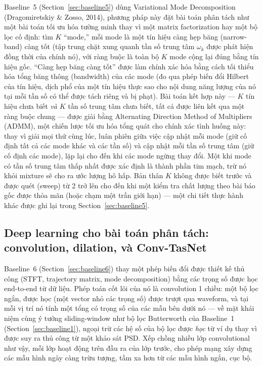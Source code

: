 \documentclass[11pt]{article}
\begin{document}
Baseline~5 (Section~\ref{sec:baseline5}) dùng Variational Mode
Decomposition (Dragomiretskiy \& Zosso, 2014), phương pháp này đặt bài
toán phân tách như một bài toán tối ưu hóa tường minh thay vì một matrix
factorization hay một bộ lọc cố định: tìm $K$ ``mode,'' mỗi mode là một
tín hiệu càng hẹp băng (narrow-band) càng tốt (tập trung chặt xung quanh
tần số trung tâm $\omega_k$ được phát hiện đồng thời của chính nó), với
ràng buộc là toàn bộ $K$ mode cộng lại đúng bằng tín hiệu gốc. ``Càng hẹp
băng càng tốt'' được làm chính xác hóa bằng cách tối thiểu hóa tổng băng
thông (bandwidth) của các mode (đo qua phép biến đổi Hilbert của tín
hiệu, dịch phổ của một tín hiệu thực sao cho nội dung năng lượng của nó
tại mỗi tần số có thể được tách riêng và bị phạt). Bài toán kết hợp này
--- $K$ tín hiệu chưa biết \emph{và} $K$ tần số trung tâm chưa biết, tất
cả được liên kết qua một ràng buộc chung --- được giải bằng Alternating
Direction Method of Multipliers (ADMM), một chiến lược tối ưu hóa tổng
quát cho chính xác tình huống này: thay vì giải mọi thứ cùng lúc, luân
phiên giữa việc cập nhật mỗi mode (giữ cố định tất cả các mode khác và
các tần số) và cập nhật mỗi tần số trung tâm (giữ cố định các mode), lặp
lại cho đến khi các mode ngừng thay đổi. Một khi mode có tần số trung tâm
thấp nhất được xác định là thành phần tim mạch, trừ nó khỏi mixture sẽ
cho ra ước lượng hô hấp. Bản thân $K$ không được biết trước và được quét
(sweep) từ 2 trở lên cho đến khi một kiểm tra chất lượng theo bài báo gốc
được thỏa mãn (hoặc chạm một trần giới hạn) --- một chi tiết thực hành
khác được ghi lại trong Section~\ref{sec:baseline5}.

\subsection{Deep learning cho bài toán phân tách: convolution, dilation, và Conv-TasNet}
\label{sec:bg-convtasnet}

Baseline~6 (Section~\ref{sec:baseline6}) thay một phép biến đổi được thiết
kế thủ công (STFT, trajectory matrix, mode decomposition) bằng các trọng
số được học end-to-end từ dữ liệu. Phép toán cốt lõi của nó là convolution
1 chiều: một bộ lọc ngắn, được học (một vector nhỏ các trọng số) được
trượt qua waveform, và tại mỗi vị trí nó tính một tổng có trọng số của các
mẫu bên dưới nó --- về mặt khái niệm cùng ý tưởng sliding-window như bộ
lọc Butterworth của Baseline~1 (Section~\ref{sec:baseline1}), ngoại trừ
các hệ số của bộ lọc được \emph{học} từ ví dụ thay vì được suy ra thủ công
từ một khảo sát PSD. Xếp chồng nhiều lớp convolutional như vậy, mỗi lớp
hoạt động trên đầu ra của lớp trước, cho phép mạng xây dựng các mẫu hình
ngày càng trừu tượng, tầm xa hơn từ các mẫu hình ngắn, cục bộ.
\end{document}
